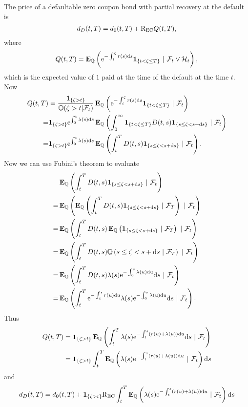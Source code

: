 The price of a defaultable zero coupon bond with partial recovery at the default is
\begin{align}
d_D(t,T) = d_0 (t,T) + \mathrm{R_{EC}} Q(t,T) ,
\end{align}
where
  \begin{align}
    Q(t,T) = \operatorname{\boldsymbol{\mathrm{E}}}_{\mathbb{Q}} \left( \mathrm{e}^{ - \int_t^{\zeta} r(s) \mathrm{d} s } \boldsymbol{1}_{\{t < \zeta \leq T\}} \ | \ \mathcal{F}_t \vee \mathcal{H}_t \right),
  \end{align}
which is the expected value of $1$ paid at the time of the default at the time $t$. Now
  \begin{align}
    Q(t,T) &= \frac{ \boldsymbol{1}_{ \{\zeta > t \} } }{ \mathbb{Q} (\zeta > t | \mathcal{F}_t) } \operatorname{\boldsymbol{\mathrm{E}}}_{\mathbb{Q}} \left( \mathrm{e}^{ - \int_t^{\zeta} r(s) \mathrm{d} s } \boldsymbol{1}_{\{t < \zeta \leq T\}} \ | \ \mathcal{F}_t \right) \\
    = & \boldsymbol{1}_{ \{\zeta > t \} } \mathrm{e}^{ \int_0^t \lambda(s) \mathrm{d} s } \operatorname{\boldsymbol{\mathrm{E}}}_{\mathbb{Q}} \left( \int_0^{\infty} \boldsymbol{1}_{\{t < \zeta \leq T\}} D(t,s) \boldsymbol{1}_{ \{ s \leq \zeta < s + \mathrm{d} s \} } \ | \ \mathcal{F}_t \right) \\
    = & \boldsymbol{1}_{ \{\zeta > t \} } \mathrm{e}^{ \int_0^t \lambda(s) \mathrm{d} s } \operatorname{\boldsymbol{\mathrm{E}}}_{\mathbb{Q}} \left( \int_{t}^{T} D(t,s) \boldsymbol{1}_{ \{ s \leq \zeta < s + \mathrm{d} s \} } \ | \ \mathcal{F}_t \right) .
  \end{align}
Now we can use Fubini's theorem to evaluate
  \begin{align}
  &\operatorname{\boldsymbol{\mathrm{E}}}_{\mathbb{Q}} \left( \int_{t}^{T} D(t,s) \boldsymbol{1}_{ \{ s \leq \zeta < s + \mathrm{d} s \} } \ | \ \mathcal{F}_t \right) \\
  = &\operatorname{\boldsymbol{\mathrm{E}}}_{\mathbb{Q}} \left( \operatorname{\boldsymbol{\mathrm{E}}}_{\mathbb{Q}}  \left( \int_{t}^{T} D(t,s) \boldsymbol{1}_{ \{ s \leq \zeta < s + \mathrm{d} s \} } \ | \ \mathcal{F}_{T} \right) \ | \ \mathcal{F}_t \right) \\
    = &\operatorname{\boldsymbol{\mathrm{E}}}_{\mathbb{Q}} \left( \int_{t}^{T} D(t,s) \operatorname{\boldsymbol{\mathrm{E}}}_{\mathbb{Q}}  \left( \boldsymbol{1}_{ \{ s \leq \zeta < s + \mathrm{d} s \} } \ | \ \mathcal{F}_{T} \right) \ | \ \mathcal{F}_t \right) \\
    = &\operatorname{\boldsymbol{\mathrm{E}}}_{\mathbb{Q}} \left( \int_{t}^{T} D(t,s) \mathbb{Q} \left( s \leq \zeta < s + \mathrm{d} s \ | \ \mathcal{F}_{T} \right) \ | \ \mathcal{F}_t \right) \\
    =  &\operatorname{\boldsymbol{\mathrm{E}}}_{\mathbb{Q}} \left( \int_{t}^{T} D(t,s) \lambda(s) \mathrm{e}^{ - \int_0^s \lambda(u) \mathrm{d} u } \mathrm{d} s \ | \ \mathcal{F}_t \right) \\
    =  &\operatorname{\boldsymbol{\mathrm{E}}}_{\mathbb{Q}} \left( \int_{t}^{T} \mathrm{e}^{ - \int_t^s r(u) \mathrm{d} u }  \lambda(s) \mathrm{e}^{ - \int_0^s \lambda(u) \mathrm{d} u } \mathrm{d} s \ | \ \mathcal{F}_t \right) .   
  \end{align}
Thus
  \begin{align}
    Q(t,T) &= \boldsymbol{1}_{ \{\zeta > t \} } \operatorname{\boldsymbol{\mathrm{E}}}_{\mathbb{Q}} \left( \int_{t}^{T}  \lambda(s) \mathrm{e}^{ - \int_t^s (r(u) + \lambda(u)) \mathrm{d} u } \mathrm{d} s \ | \ \mathcal{F}_t \right) \\
    &= \boldsymbol{1}_{ \{\zeta > t \} } \int_{t}^{T} \operatorname{\boldsymbol{\mathrm{E}}}_{\mathbb{Q}} \left( \lambda(s) \mathrm{e}^{ - \int_t^s (r(u) + \lambda(u)) \mathrm{d} u } \ | \ \mathcal{F}_t \right) \mathrm{d} s
  \end{align}
 and
\begin{align}
d_D(t,T) = d_0 (t,T) + \boldsymbol{1}_{ \{\zeta > t \} } \mathrm{R_{EC}} \int_{t}^{T} \operatorname{\boldsymbol{\mathrm{E}}}_{\mathbb{Q}} \left( \lambda(s) \mathrm{e}^{ - \int_t^s (r(u) + \lambda(u)) \mathrm{d} u } \ | \ \mathcal{F}_t \right) \mathrm{d} s
\end{align}
